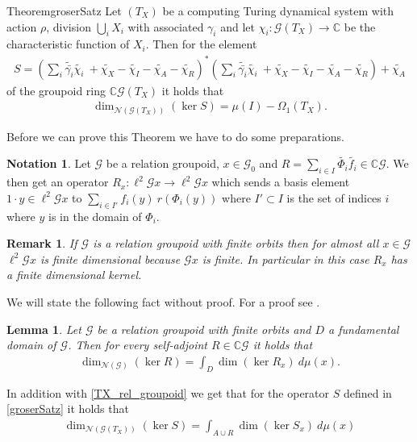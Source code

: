 \documentclass[12pt,a4paper]{scrartcl}
\theoremstyle{plain}
\newtheorem{Lemma}[Theorem]{Lemma}
\newtheorem{Remark}[Theorem]{Remark}
\theoremstyle{definition}
\newtheorem{Notation}[Theorem]{Notation}
\newcommand{\C}{\mathbb{C}} %
\newcommand{\2}{\mathbb{Z} / 2 \mathbb{Z}}
\newcommand{\G}{\mathcal{G}}
\newcommand{\1}{\bar{1}}
\newcommand{\0}{\bar{0}}
\begin{document}
\begin{restatable}{Theorem}{groserSatz} \label{groserSatz}
	Let $(T_X)$ be a computing Turing dynamical system with action $\rho$, division $\bigcup_i X_i$ with associated $\gamma_i$ and let $\chi_i \colon\G(T_X) \to \C$ be the characteristic function of $X_i$. Then for the element
	\begin{align*}
		S = (\sum_{i} \widetilde{\bar{\gamma_i}} \widetilde{\chi_i} \ + \widetilde{\chi_X} - \widetilde{\chi_I} - \widetilde{\chi_A} - \widetilde{\chi_R})^*(\sum_{i} \widetilde{\bar{\gamma_i}} \widetilde{\chi_i} \ + \widetilde{\chi_X} - \widetilde{\chi_I} - \widetilde{\chi_A} - \widetilde{\chi_R}) + \widetilde{\chi_A}
	\end{align*}
	of the groupoid ring $\C \G(T_X)$ it holds that
	\begin{align*}
		\dim_{\mathcal{N}(\G(T_X))}(\ker S) = \mu(I) - \Omega_1(T_X).
	\end{align*}
\end{restatable}
Before we can prove this Theorem we have to do some preparations. 
\begin{Notation}
	Let $\G$ be a relation groupoid, $x \in \G_0$ and $R = \sum_{i \in I} \widetilde{\Phi_i} \widetilde{f_i} \in \C\G$. We then get an operator $R_x\colon\ell^2\G x \to \ell^2\G x$ which sends a basis element $1 \cdot y \in \ell^2\G x$ to $\sum_{i \in I'} f_i(y) ~ r(\Phi_i(y)) $ where $I' \subset I$ is the set of indices $i$ where $y$ is in the domain of $\Phi_i$. 
\end{Notation}
\begin{Remark}
	If $\G$ is a relation groupoid with finite orbits then for almost all $x \in \G$ $\ell^2\G x$ is finite dimensional because $\G x$ is finite. In particular in this case $R_x$ has a finite dimensional kernel.
\end{Remark}
We will state the following fact without proof. For a proof see \cite{GRAB}.
\begin{Lemma} \label{T_to_Tx}
	Let $\G$ be a relation groupoid with finite orbits and $D$ a fundamental domain of $\G$. Then for every self-adjoint $R \in \C \G$ it holds that
	\begin{align*}
		\dim_{\mathcal{N}(\G)}(\ker R) = \int_D \dim (\ker R_x) \ d \mu (x).
	\end{align*} 
\end{Lemma}
In addition with \ref{TX_rel_groupoid} we get that for the operator $S$ defined in \ref{groserSatz} it holds that
\begin{align*}
	\dim_{\mathcal{N}(\G(T_X))}(\ker S) = \int_{A \cup R} \dim (\ker S_x) \ d \mu (x)
\end{align*}
\end{document}
